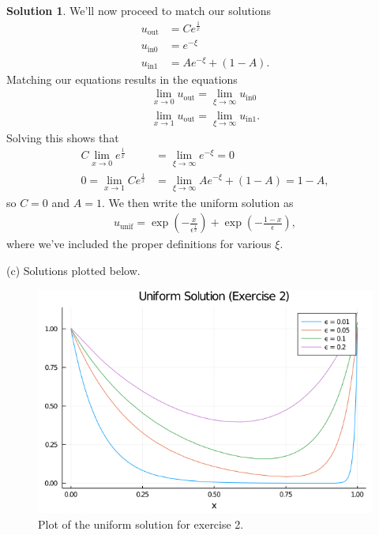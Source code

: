 \documentclass[12pt]{article}
\theoremstyle{definition}
\newtheorem{sol}{Solution}
\theoremstyle{remark}
\begin{document}
\begin{sol}
We'll now proceed to match our solutions
\begin{align*}
    u_{\text{out}} &= C e^{\frac{1}{x}}\\
    u_{\text{in}0} &= e^{- \xi}\\
    u_{\text{in}1} &=  A e^{-\xi} + (1 - A).
\end{align*}
Matching our equations results in the equations
\begin{align*}
    \lim_{x\to 0} u_{\text{out}} = \lim_{\xi \to \infty}  u_{\text{in}0}\\
    \lim_{x\to 1} u_{\text{out}} = \lim_{\xi \to \infty}  u_{\text{in}1}.
\end{align*}
Solving this shows that
\begin{align*}
    C \lim_{x\to 0} e^{\frac{1}{x}} &= \lim_{\xi \to \infty}  e^{-\xi} = 0\\
    0 = \lim_{x\to 1} C e^{\frac{1}{x}} &= \lim_{\xi \to \infty}  A e^{-\xi} + (1 - A) = 1 - A,
\end{align*}
so $C = 0$ and $A = 1$. We then write the uniform solution as 
\begin{align*}
    u_{\text{unif}} = \exp\left( - \frac{x}{\epsilon^{\frac{1}{2}}} \right) + \exp \left( - \frac{1- x}{\epsilon} \right),
\end{align*}
where we've included the proper definitions for various $\xi$.

(c) Solutions plotted below.

\newpage

\begin{figure}[h]
    \centering
    \includegraphics[width=0.8\linewidth]{figs/hw-5-exer-2.png}
    \caption{Plot of the uniform solution for exercise 2.}%
    \label{fig:figs/hw-5-exer-2}
\end{figure}
\end{sol}
\end{document}
